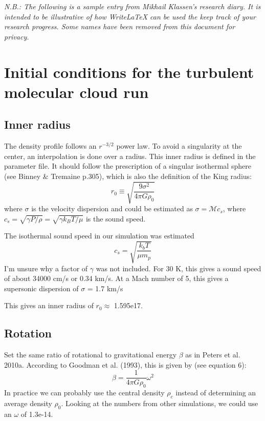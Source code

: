 \documentclass[a4paper]{tufte-handout}
\begin{document}
\textit{N.B.: The following is a sample entry from Mikhail Klassen's research diary. It is intended to be illustrative of how WriteLaTeX can be used the keep track of your research progress. Some names have been removed from this document for privacy.}

\section*{Initial conditions for the turbulent molecular cloud run}

\subsection*{Inner radius}

The density profile follows an $r^{-3/2}$ power law. To avoid a singularity at the center, an interpolation is done over a radius. This inner radius is defined in the parameter file. It should follow the prescription of a singular isothermal sphere (see Binney \& Tremaine p.305), which is also the definition of the King radius:
\begin{equation}
r_0 \equiv \sqrt{\frac{9\sigma^2}{4\pi G\rho_0}}
\end{equation}
where $\sigma$ is the velocity dispersion and could be estimated as $\sigma = \mathcal{M} c_s$, where $c_s = \sqrt{\gamma P/\rho} = \sqrt{\gamma k_B T / \mu}$ is the sound speed.

The isothermal sound speed in our simulation was estimated
\begin{equation}
c_s = \sqrt{\frac{k_b T}{\mu m_p}}
\end{equation}
I'm unsure why a factor of $\gamma$ was not included. For 30 K, this gives a sound speed of about 34000 cm/s or 0.34 km/s. At a Mach number of 5, this gives a supersonic dispersion of $\sigma$ = 1.7 km/s

This gives an inner radius of $r_0 \approx$ 1.595e17. 

\subsection*{Rotation}

Set the same ratio of rotational to gravitational energy $\beta$ as in Peters et al. 2010a. According to Goodman et al. (1993), this is given by (see equation 6):
\begin{equation}
\beta = \frac{1}{4 \pi G \rho_0} \omega^2
\end{equation}
In practice we can probably use the central density $\rho_c$ instead of determining an average density $\rho_0$. Looking at the numbers from other simulations, we could use an $\omega$ of 1.3e-14.
\end{document}
